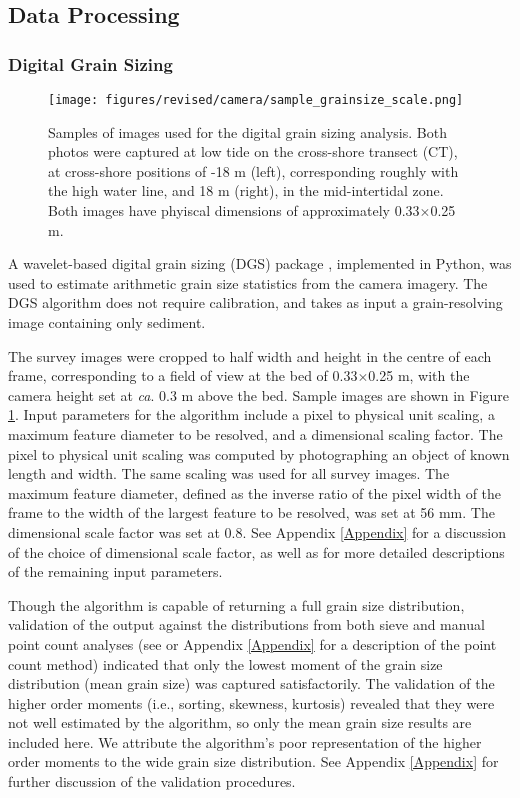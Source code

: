 \documentclass[jmse,article,submit,pdftex,moreauthors]{Definitions/mdpi}
\begin{document}
\subsection{Data Processing}

\subsubsection{Digital Grain Sizing}\label{Methods:DGS}

\begin{figure}[tbp]
	\texttt{[image: figures/revised/camera/sample\_grainsize\_scale.png]}
	\caption[Sample photos used for sediment grain sizing]{Samples of images used for the digital grain sizing analysis. Both photos were captured at low tide on the cross-shore transect (CT), at cross-shore positions of -18 m (left), corresponding roughly with the high water line, and 18 m (right), in the mid-intertidal zone. Both images have phyiscal dimensions of approximately 0.33$\times$0.25 m.\label{fig:sample_grainsize}}
\end{figure}

A wavelet-based digital grain sizing (DGS) package \citep{Buscombe2013}, implemented in Python, was used to estimate arithmetic grain size statistics from the camera imagery. The DGS algorithm does not require calibration, and takes as input a grain-resolving image containing only sediment. 

The survey images were cropped to half width and height in the centre of each frame, corresponding to a field of view at the bed of 0.33$\times$0.25 m, with the camera height set at \textit{ca}. 0.3 m above the bed. Sample images are shown in Figure \ref{fig:sample_grainsize}. Input parameters for the algorithm include a pixel to physical unit scaling, a maximum feature diameter to be resolved, and a dimensional scaling factor. The pixel to physical unit scaling was computed by photographing an object of known length and width. The same scaling was used for all survey images. The maximum feature diameter, defined as the inverse ratio of the pixel width of the frame to the width of the largest feature to be resolved, was set at 56 mm. The dimensional scale factor was set at 0.8. See Appendix \ref{Appendix} for a discussion of the choice of dimensional scale factor, as well as for more detailed descriptions of the remaining input parameters. 

Though the algorithm is capable of returning a full grain size distribution, validation of the output against the distributions from both sieve and manual point count analyses (see \citep{Barnard_etal2007, Buscombe_etal2010} or Appendix \ref{Appendix} for a description of the point count method)  indicated that only the lowest moment of the grain size distribution (mean grain size) was captured satisfactorily. The validation of the higher order moments (i.e., sorting, skewness, kurtosis) revealed that they were not well estimated by the algorithm, so only the mean grain size results are included here. We attribute the algorithm's poor representation of the higher order moments to the wide grain size distribution. See Appendix \ref{Appendix} for further discussion of the validation procedures.
\end{document}
